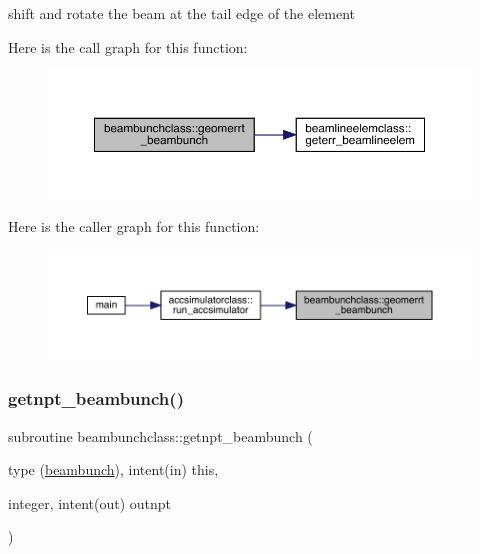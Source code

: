 shift and rotate the beam at the tail edge of the element 

Here is the call graph for this function\+:\nopagebreak
\begin{figure}[H]
\begin{center}
\leavevmode
\includegraphics[width=350pt]{namespacebeambunchclass_ab2f6f9e95d5786dab15c1b73f305e349_cgraph}
\end{center}
\end{figure}
Here is the caller graph for this function\+:\nopagebreak
\begin{figure}[H]
\begin{center}
\leavevmode
\includegraphics[width=350pt]{namespacebeambunchclass_ab2f6f9e95d5786dab15c1b73f305e349_icgraph}
\end{center}
\end{figure}
\mbox{\label{namespacebeambunchclass_aec332b229b76111b68db82b20ab2846e}} 
\subsubsection{\texorpdfstring{getnpt\_beambunch()}{getnpt\_beambunch()}}
{\footnotesize\ttfamily subroutine beambunchclass\+::getnpt\+\_\+beambunch (\begin{DoxyParamCaption}\item[{type (\mbox{\hyperlink{namespacebeambunchclass_structbeambunchclass_1_1beambunch}{beambunch}}), intent(in)}]{this,  }\item[{integer, intent(out)}]{outnpt }\end{DoxyParamCaption})}



